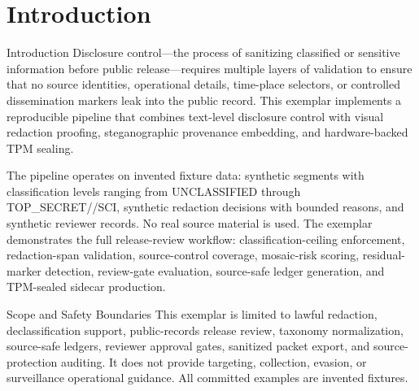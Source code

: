 \documentclass[
  ignorenonframetext,
]{beamer}
\author{\texorpdfstring{}{}}
\date{}
\begin{document}
\section{Introduction}\label{introduction}

\begin{frame}[allowframebreaks]{Introduction}
Disclosure control---the process of sanitizing classified or sensitive
information before public release---requires multiple layers of
validation to ensure that no source identities, operational details,
time-place selectors, or controlled dissemination markers leak into the
public record. This exemplar implements a reproducible pipeline that
combines text-level disclosure control with visual redaction proofing,
steganographic provenance embedding, and hardware-backed TPM sealing.

The pipeline operates on invented fixture data: synthetic segments with
classification levels ranging from UNCLASSIFIED through
TOP\_SECRET//SCI, synthetic redaction decisions with bounded reasons,
and synthetic reviewer records. No real source material is used. The
exemplar demonstrates the full release-review workflow:
classification-ceiling enforcement, redaction-span validation,
source-control coverage, mosaic-risk scoring, residual-marker detection,
review-gate evaluation, source-safe ledger generation, and TPM-sealed
sidecar production.
\end{frame}

\begin{frame}[allowframebreaks]{Scope and Safety Boundaries}
\protect{}\label{scope-and-safety-boundaries}
This exemplar is limited to lawful redaction, declassification support,
public-records release review, taxonomy normalization, source-safe
ledgers, reviewer approval gates, sanitized packet export, and
source-protection auditing. It does not provide targeting, collection,
evasion, or surveillance operational guidance. All committed examples
are invented fixtures.
\end{frame}
\end{document}
